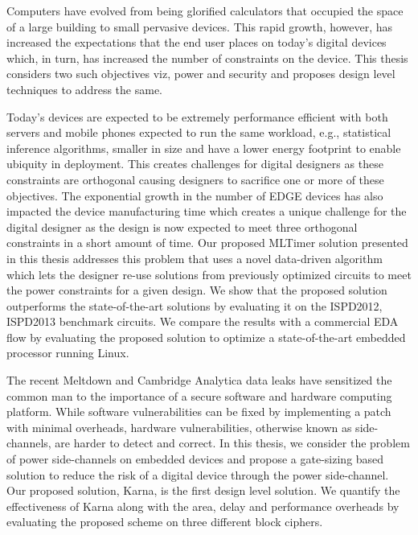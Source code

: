 Computers have evolved from being glorified calculators that occupied the space of a large building to small pervasive devices. This rapid growth, however, has increased the expectations that the end user places on today's digital devices which, in turn, has increased the number of constraints on the device. This thesis considers two such objectives viz, power and security and proposes design level techniques to address the same.

Today's devices are expected to be extremely performance efficient with both servers and mobile phones expected to run the same workload, e.g., statistical inference algorithms, smaller in size and have a lower energy footprint to enable ubiquity in deployment. This creates challenges for digital designers as these constraints are orthogonal causing designers to sacrifice one or more of these objectives. The exponential growth in the number of EDGE devices has also impacted the device manufacturing time which creates a unique challenge for the digital designer as the design is now expected to meet three orthogonal constraints in a short amount of time. Our proposed MLTimer solution presented in this thesis addresses this problem that uses a novel data-driven algorithm which lets the designer re-use solutions from previously optimized circuits to meet the power constraints for  a given design. We show that the proposed solution outperforms the state-of-the-art solutions by evaluating it on the ISPD2012, ISPD2013 benchmark circuits. We compare the results with a commercial EDA flow by evaluating the proposed solution to optimize a state-of-the-art embedded processor running Linux.

The recent Meltdown and Cambridge Analytica data leaks have sensitized the common man to the importance of a secure software and hardware computing platform. While software vulnerabilities can be fixed by implementing a patch with minimal overheads, hardware vulnerabilities, otherwise known as side-channels, are harder to detect and correct. In this thesis, we consider the problem of power side-channels on embedded devices and propose a gate-sizing based solution to reduce the risk of a digital device through the power side-channel. Our proposed solution, Karna, is the first design level solution. We quantify the effectiveness of Karna along with the area, delay and performance overheads by evaluating the proposed scheme on three different block ciphers.


